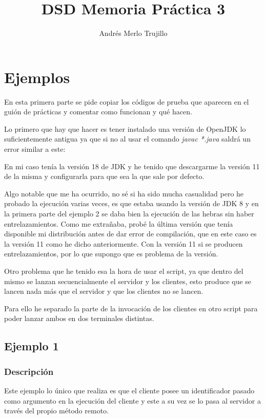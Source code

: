 \documentclass{article}
\title{DSD Memoria Práctica 3}
\author{Andrés Merlo Trujillo}
\date{}
\begin{document}
\maketitle

\section{Ejemplos}
En esta primera parte se pide copiar los códigos de prueba que aparecen en el guión de prácticas y comentar como funcionan y qué hacen.

Lo primero que hay que hacer es tener instalado una versión de OpenJDK lo suficientemente antigua ya que si no al usar el comando \textit{javac *.java} saldrá un error similar a este:


En mi caso tenía la versión 18 de JDK y he tenido que descargarme la versión 11 de la misma y configurarla para que sea la que sale por defecto.

Algo notable que me ha ocurrido, no sé si ha sido mucha casualidad pero he probado la ejecución varias veces, es que estaba usando la versión de JDK 8 y en la primera parte del ejemplo 2 se daba bien la ejecución de las hebras sin haber entrelazamientos. Como me extrañaba, probé la última versión que tenía disponible mi distribución antes de dar error de compilación, que en este caso es la versión 11 como he dicho anteriormente. Con la versión 11 si se producen entrelazamientos, por lo que supongo que es problema de la versión.

Otro problema que he tenido esa la hora de usar el script, ya que dentro del mismo se lanzan secuencialmente el servidor y los clientes, esto produce que se lancen nada más que el servidor y que los clientes no se lancen.

Para ello he separado la parte de la invocación de los clientes en otro script para poder lanzar ambos en dos terminales distintas.

\subsection{Ejemplo 1}
\subsubsection{Descripción}
Este ejemplo lo único que realiza es que el cliente posee un identificador pasado como argumento en la ejecución del cliente y este a su vez se lo pasa al servidor a través del propio método remoto.
\end{document}
